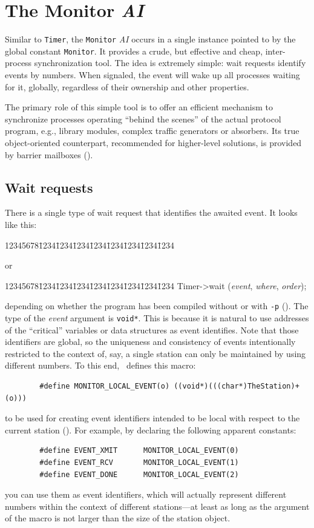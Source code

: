 \section{The Monitor {\em AI\/}}
\label{rm_mo}

Similar to {\tt Timer}, the {\tt Monitor} {\em AI\/} occurs in a single
instance pointed to by the global constant {\tt Monitor}.
It provides a crude, but effective and cheap,
inter-process synchronization tool.
The idea is extremely simple: wait requests identify events by numbers.
When signaled, the event will wake up all processes waiting for it, globally,
regardless of their ownership and other properties.

The primary role of this simple tool is to offer an efficient mechanism to
synchronize processes operating ``behind the scenes'' of the actual
protocol program, e.g., library modules, complex traffic generators or
absorbers.
Its true object-oriented counterpart, recommended for higher-level solutions,
is provided by barrier mailboxes ().

\subsection{Wait requests}
\label{rm_mo_wr}

There is a single type of wait request that identifies the awaited event.
It looks like this:
{\tt\begin{tabbing}
12345678\=1234\=1234\=1234\=1234\=1234\=1234\=1234\=1234\kill
{}
\end{tabbing}}
\noindent
or
{\tt\begin{tabbing}
12345678\=1234\=1234\=1234\=1234\=1234\=1234\=1234\=1234\kill
\>Timer->wait ({\em event}, {\em where}, {\em order});
\end{tabbing}}
\noindent
depending on whether the program has been compiled without or with {\tt -p}
().
The type of the {\em event\/} argument is {\tt void*}.
This is because it is natural to use addresses of the ``critical'' variables
or data structures as event identifies.
Note that those identifiers are global, so the uniqueness and consistency of
events intentionally restricted to the context of, say, a single station
can only be maintained by using different numbers.
To this end, \smurph\ defines this macro:
\begin{verbatim}
        #define MONITOR_LOCAL_EVENT(o) ((void*)(((char*)TheStation)+(o)))
\end{verbatim}
\noindent
to be used for creating event identifiers
intended to be local with respect to the
current station ().
For example, by declaring the following apparent constants:
\begin{verbatim}
        #define EVENT_XMIT      MONITOR_LOCAL_EVENT(0)
        #define EVENT_RCV       MONITOR_LOCAL_EVENT(1)
        #define EVENT_DONE      MONITOR_LOCAL_EVENT(2)
\end{verbatim}
\noindent
you can use them as event identifiers, which will actually represent different
numbers within the context of different stations---at least as long as the
argument of the macro is not larger than the size of the station object.


